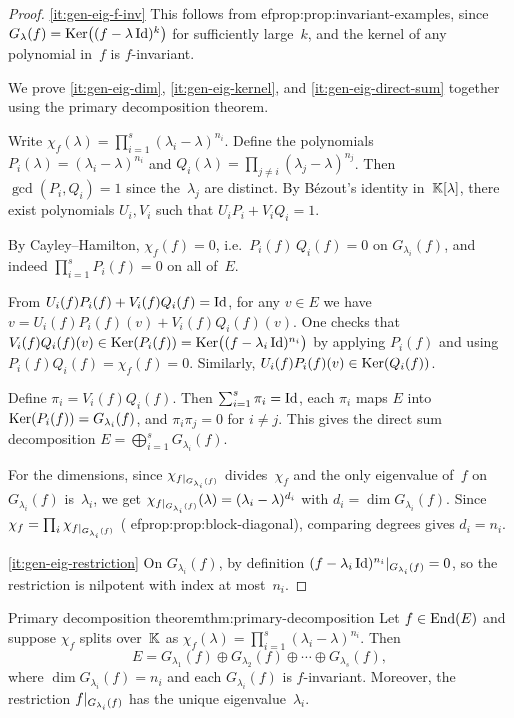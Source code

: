 \begin{proof}
\ref{it:gen-eig-f-inv}\;
This follows from 
ef{prop:prop:invariant-examples}, since
$G_\lambda(f) = \operatorname{Ker}\bigl((f - \lambda\operatorname{Id})^k\bigr)$ for
sufficiently large~$k$, and the kernel of any polynomial in~$f$ is
$f$-invariant.

\medskip\noindent
We prove \ref{it:gen-eig-dim}, \ref{it:gen-eig-kernel}, and
\ref{it:gen-eig-direct-sum} together using the primary decomposition
theorem.

Write $\chi_f(\lambda) = \prod_{i=1}^s (\lambda_i - \lambda)^{n_i}$.
Define the polynomials $P_i(\lambda) = (\lambda_i - \lambda)^{n_i}$
and $Q_i(\lambda) = \prod_{j \neq i} (\lambda_j - \lambda)^{n_j}$.
Then $\gcd(P_i, Q_i) = 1$ since the~$\lambda_j$ are distinct.
By B\'ezout's identity in~${\mathbb{K}}[\lambda]$, there exist polynomials
$U_i, V_i$ such that $U_i P_i + V_i Q_i = 1$.

By Cayley--Hamilton, $\chi_f(f) = 0$, i.e.\ $P_i(f)\,Q_i(f) = 0$
on $G_{\lambda_i}(f)$, and indeed
$\prod_{i=1}^s P_i(f) = 0$ on all of~$E$.

From $U_i(f) P_i(f) + V_i(f) Q_i(f) = \operatorname{Id}$, for any $v \in E$ we
have $v = U_i(f)P_i(f)(v) + V_i(f)Q_i(f)(v)$.  One checks that
$V_i(f)Q_i(f)(v) \in \operatorname{Ker}(P_i(f)) = \operatorname{Ker}\bigl((f -
\lambda_i\operatorname{Id})^{n_i}\bigr)$ by applying $P_i(f)$ and using
$P_i(f)Q_i(f) = \chi_f(f) = 0$.  Similarly,
$U_i(f)P_i(f)(v) \in \operatorname{Ker}(Q_i(f))$.

Define $\pi_i = V_i(f)Q_i(f)$.  Then $\sum_{i=1}^s \pi_i = \operatorname{Id}$,
each $\pi_i$ maps $E$ into $\operatorname{Ker}(P_i(f)) = G_{\lambda_i}(f)$, and
$\pi_i \pi_j = 0$ for $i \neq j$.  This gives the direct sum
decomposition $E = \bigoplus_{i=1}^s G_{\lambda_i}(f)$.

For the dimensions, since
$\chi_{f{|_{G_{\lambda_i}(f)}}}$ divides~$\chi_f$ and
the only eigenvalue of~$f$ on $G_{\lambda_i}(f)$ is~$\lambda_i$,
we get $\chi_{f{|_{G_{\lambda_i}(f)}}}(\lambda) =
(\lambda_i - \lambda)^{d_i}$ with $d_i = \dim G_{\lambda_i}(f)$.
Since $\chi_f = \prod_i \chi_{f{|_{G_{\lambda_i}(f)}}}$
(
ef{prop:prop:block-diagonal}), comparing degrees gives $d_i = n_i$.

\ref{it:gen-eig-restriction}\;
On $G_{\lambda_i}(f)$, by definition
$(f - \lambda_i\operatorname{Id})^{n_i}{|_{G_{\lambda_i}(f)}} = 0$,
so the restriction is nilpotent with index at most~$n_i$.
\end{proof}

\begin{theorem}{Primary decomposition theorem}{thm:primary-decomposition}
Let $f \in \operatorname{End}(E)$ and suppose $\chi_f$ splits over~${\mathbb{K}}$ as
$\chi_f(\lambda) = \prod_{i=1}^{s} (\lambda_i - \lambda)^{n_i}$.
Then
\[
  \boxed{E = G_{\lambda_1}(f) \oplus G_{\lambda_2}(f) \oplus \cdots
    \oplus G_{\lambda_s}(f),}
\]
where $\dim G_{\lambda_i}(f) = n_i$ and each $G_{\lambda_i}(f)$ is
$f$-invariant.  Moreover, the restriction $f{|_{G_{\lambda_i}(f)}}$
has the unique eigenvalue~$\lambda_i$.
\end{theorem}

